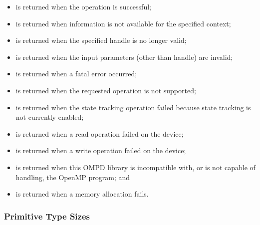 \begin{itemize}
\label{ompd:ompd_rc_ok}
\item {} is returned when the operation is successful;

\label{ompd:ompd_rc_unavailable}
\item {} is returned when information is not 
      available for the specified context;

\label{ompd:ompd_rc_stale_handle}
\item {} is returned when the specified handle 
      is no longer valid;

\label{ompd:ompd_rc_bad_input}
\item {} is returned when the input parameters 
      (other than handle) are invalid;

\label{ompd:ompd_rc_error}
\item {} is returned when a fatal error occurred;

\label{ompd:ompd_rc_unsupported}
\item {} is returned when the requested 
      operation is not supported;

\label{ompd:ompd_rc_needs_state_tracking}
\item {} is returned when the state 
      tracking operation failed because state tracking is not currently enabled;

\label{ompd:ompd_rc_device_read_error}
\item {} is returned when a read operation 
      failed on the device;

\label{ompd:ompd_rc_device_write_error}
\item {} is returned when a write operation 
      failed on the device;

\label{ompd:ompd_rc_incompatible}
\item {} is returned when this OMPD library is
      incompatible with, or is not capable of handling, the OpenMP program; and

\label{ompd:ompd_rc_nomem}
\item {} is returned when a memory allocation fails.
\end{itemize}



\subsubsection{Primitive Type Sizes}
\label{subsubsec:ompd_device_type_sizes_t}

